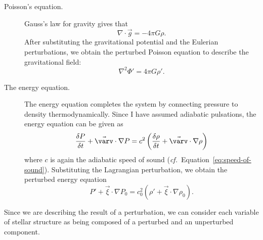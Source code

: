 \begin{description}
    \item[Poisson's equation.] %
    Gauss's law for gravity gives that
    \begin{equation}
        \nabla \cdot \vec g
        =
        -4\pi G \rho.
    \end{equation}
    After substituting the gravitational potential and the Eulerian perturbations, we obtain the perturbed Poisson equation to describe the gravitational field: 
    \begin{equation} \label{eq:perturbed-poisson} \boxed{
        \nabla^2 \Phi'
        =
        4\pi G \rho'.
    }\end{equation}
    
    \item[The energy equation.]
    The energy equation completes the system by connecting pressure to density thermodynamically. 
    Since I have assumed adiabatic pulsations, the energy equation can be given as
    \begin{equation} %
        \frac{\delta P}{\delta t}
        +
        \vec{\varv}
        \cdot
        \nabla P
        =
        c^2 
        \left(
            \frac{\delta \rho}{\delta t}
            +
            \vec{\varv} \cdot \nabla \rho
        \right)
    \end{equation}
    where $c$ is again the adiabatic speed of sound (\emph{cf.}~Equation~\ref{eq:speed-of-sound}). 
    Substituting the Lagrangian perturbation, we obtain the perturbed energy equation
    \begin{equation} \label{eq:perturbed-energy} \boxed{
        P'
        +
        \vec \xi \cdot \nabla P_0
        =
        c^2_0 \left( 
            \rho' + \vec \xi \cdot \nabla \rho_0
        \right).
    }\end{equation}
\end{description}

\iffalse
Since we are describing the result of a perturbation, we can consider each variable of stellar structure as being composed of a perturbed and an unperturbed component. 


